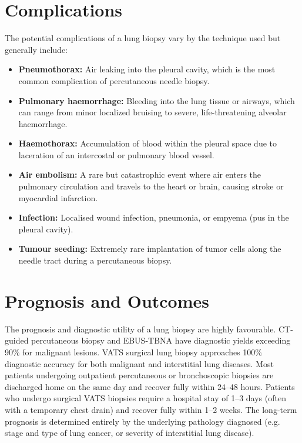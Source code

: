 \section*{Complications}
The potential complications of a lung biopsy vary by the technique used but generally include:
\begin{itemize}
    \item \textbf{Pneumothorax:} Air leaking into the pleural cavity, which is the most common complication of percutaneous needle biopsy.
    \item \textbf{Pulmonary haemorrhage:} Bleeding into the lung tissue or airways, which can range from minor localized bruising to severe, life-threatening alveolar haemorrhage.
    \item \textbf{Haemothorax:} Accumulation of blood within the pleural space due to laceration of an intercostal or pulmonary blood vessel.
    \item \textbf{Air embolism:} A rare but catastrophic event where air enters the pulmonary circulation and travels to the heart or brain, causing stroke or myocardial infarction.
    \item \textbf{Infection:} Localised wound infection, pneumonia, or empyema (pus in the pleural cavity).
    \item \textbf{Tumour seeding:} Extremely rare implantation of tumor cells along the needle tract during a percutaneous biopsy.
\end{itemize}

\section*{Prognosis and Outcomes}
The prognosis and diagnostic utility of a lung biopsy are highly favourable. CT-guided percutaneous biopsy and EBUS-TBNA have diagnostic yields exceeding 90\% for malignant lesions. VATS surgical lung biopsy approaches 100\% diagnostic accuracy for both malignant and interstitial lung diseases. Most patients undergoing outpatient percutaneous or bronchoscopic biopsies are discharged home on the same day and recover fully within 24--48 hours. Patients who undergo surgical VATS biopsies require a hospital stay of 1--3 days (often with a temporary chest drain) and recover fully within 1--2 weeks. The long-term prognosis is determined entirely by the underlying pathology diagnosed (e.g. stage and type of lung cancer, or severity of interstitial lung disease).

